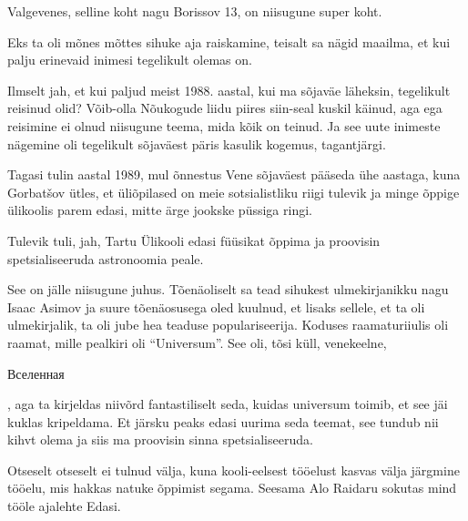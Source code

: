 
Valgevenes, selline koht nagu Borissov 13,  on niisugune super koht. 

Eks ta oli mõnes mõttes sihuke aja raiskamine, teisalt sa nägid maailma, et kui palju erinevaid inimesi tegelikult olemas on.


Ilmselt jah, et kui paljud meist 1988. aastal, kui ma sõjaväe läheksin, tegelikult reisinud olid? Võib-olla Nõukogude liidu piires siin-seal kuskil käinud, aga ega reisimine ei olnud niisugune teema, mida kõik on teinud.  Ja see uute inimeste nägemine oli tegelikult sõjaväest päris kasulik kogemus, tagantjärgi.


Tagasi tulin aastal 1989, mul õnnestus Vene sõjaväest pääseda ühe aastaga, kuna Gorbatšov ütles, et üliõpilased on meie sotsialistliku riigi tulevik ja minge õppige ülikoolis parem edasi, mitte ärge jookske püssiga ringi. 


Tulevik tuli, jah, Tartu Ülikooli edasi füüsikat õppima ja proovisin spetsialiseeruda astronoomia peale.


See on jälle niisugune juhus. Tõenäoliselt sa tead sihukest ulmekirjanikku nagu Isaac Asimov ja suure tõenäosusega oled kuulnud, et lisaks sellele, et ta oli ulmekirjalik, ta oli jube hea teaduse populariseerija. Koduses raamaturiiulis oli raamat, mille pealkiri oli \enquote{Universum}. See oli, tõsi küll, venekeelne, \begin{russian}Вселенная\end{russian}, aga ta kirjeldas niivõrd fantastiliselt seda, kuidas universum toimib, et see jäi kuklas kripeldama. Et järsku peaks edasi uurima seda teemat, see tundub nii kihvt olema ja siis ma proovisin sinna spetsialiseeruda.


Otseselt otseselt ei tulnud välja, kuna kooli-eelsest tööelust kasvas välja järgmine tööelu, mis hakkas natuke õppimist segama. Seesama Alo Raidaru sokutas mind tööle ajalehte Edasi.

